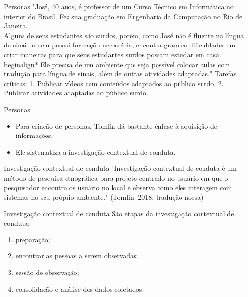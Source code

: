 \documentclass[11pt]{beamer}
\begin{document}
   \begin{frame}{Personas}
      "José, 40 anos, é professor de um Curso Técnico em Informática no interior do Brasil. Fez sua graduação em Engenharia da Computação no Rio de Janeiro.\\
      Alguns de seus estudantes são surdos, porém, como José não é fluente na língua de sinais e nem possui formação necessária, encontra grandes dificuldades em criar maneiras para que seus estudantes surdos possam estudar em casa.\\begin{align*}
      Ele precisa de um ambiente que seja possível colocar aulas com tradução para língua de sinais, além de outras atividades adaptadas."
      Tarefas críticas:
      1. Publicar vídeos com conteúdos adaptados ao público surdo.
      2. Publicar atividades adaptadas ao público surdo.
   \end{frame}

   \begin{frame}{Personas}
      \begin{itemize}
         \item Para criação de personas, Tomlin dá bastante ênfase à aquisição de informações.
         \item Ele sistematiza a investigação contextual de conduta.
      \end{itemize}
   \end{frame}

   \begin{frame}{Investigação contextual de conduta}
      "Investigação contextual de conduta é um método de pesquisa etnográfica para projeto centrado no usuário em que o pesquisador encontra os usuário no local e observa como eles interagem com sistemas no seu próprio ambiente." (Tomlin, 2018; tradução nossa)
   \end{frame}

   \begin{frame}{Investigação contextual de conduta}
      São etapas da investigação contextual de conduta:
      \begin{enumerate}
         \item preparação;
         \item encontrar as pessoas a serem observadas;
         \item sessão de observação;
         \item consolidação e análise dos dados coletados.
      \end{enumerate}
   \end{frame}
\end{document}
